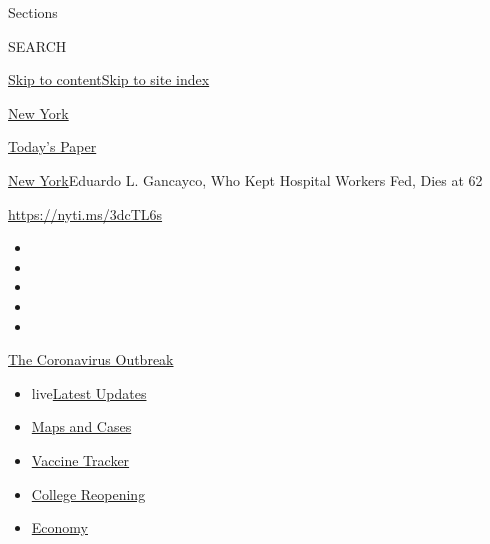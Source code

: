 Sections

SEARCH

\protect\hyperlink{site-content}{Skip to
content}\protect\hyperlink{site-index}{Skip to site index}

\href{https://www.nytimes.com/section/nyregion}{New York}

\href{https://myaccount.nytimes.com/auth/login?response_type=cookie\&client_id=vi}{}

\href{https://www.nytimes.com/section/todayspaper}{Today's Paper}

\href{/section/nyregion}{New York}\textbar{}Eduardo L. Gancayco, Who
Kept Hospital Workers Fed, Dies at 62

\url{https://nyti.ms/3dcTL6s}

\begin{itemize}
\item
\item
\item
\item
\item
\end{itemize}

\href{https://www.nytimes.com/news-event/coronavirus?action=click\&pgtype=Article\&state=default\&region=TOP_BANNER\&context=storylines_menu}{The
Coronavirus Outbreak}

\begin{itemize}
\tightlist
\item
  live\href{https://www.nytimes.com/2020/08/03/world/coronavirus-covid-19.html?action=click\&pgtype=Article\&state=default\&region=TOP_BANNER\&context=storylines_menu}{Latest
  Updates}
\item
  \href{https://www.nytimes.com/interactive/2020/us/coronavirus-us-cases.html?action=click\&pgtype=Article\&state=default\&region=TOP_BANNER\&context=storylines_menu}{Maps
  and Cases}
\item
  \href{https://www.nytimes.com/interactive/2020/science/coronavirus-vaccine-tracker.html?action=click\&pgtype=Article\&state=default\&region=TOP_BANNER\&context=storylines_menu}{Vaccine
  Tracker}
\item
  \href{https://www.nytimes.com/2020/08/02/us/covid-college-reopening.html?action=click\&pgtype=Article\&state=default\&region=TOP_BANNER\&context=storylines_menu}{College
  Reopening}
\item
  \href{https://www.nytimes.com/live/2020/08/03/business/stock-market-today-coronavirus?action=click\&pgtype=Article\&state=default\&region=TOP_BANNER\&context=storylines_menu}{Economy}
\end{itemize}

